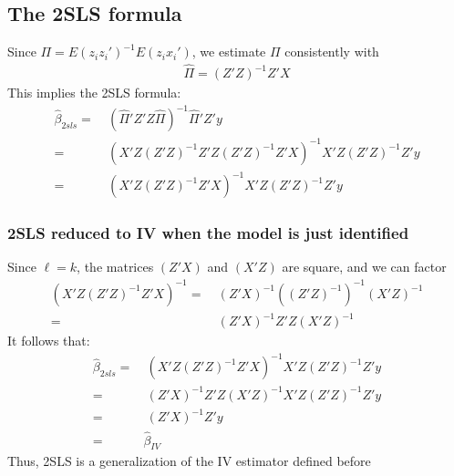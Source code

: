 \documentclass[a4paper,twoside,11pt]{article}
\begin{document}
\subsection{The 2SLS formula}
\begin{shaded*}
\noindent Since $\Pi = E(z_i z_i')^{-1} E(z_i x_i')$, we estimate $\Pi$ consistently with
\begin{equation*}
\begin{aligned}
\hat{\Pi} = (Z'Z)^{-1} Z'X
\end{aligned} 
\end{equation*}
This implies the 2SLS formula:
\begin{equation*}
\begin{aligned}
\hat{\beta}_{2sls} =& \  (\hat{\Pi}' Z'Z\hat{\Pi})^{-1} \hat{\Pi}' Z' y \\
=& \ (X'Z(Z'Z)^{-1} Z'Z(Z'Z)^{-1} Z'X)^{-1} X'Z(Z'Z)^{-1} Z'y \\
=& \ (X'Z(Z'Z)^{-1} Z'X)^{-1} X'Z(Z'Z)^{-1} Z'y
\end{aligned} 
\end{equation*}
\end{shaded*}
\subsubsection{2SLS reduced to IV when the model is just identified}
Since $\ell =k$, the matrices $(Z'X)$ and $(X'Z)$ are square, and we can factor
\begin{equation*}
\begin{aligned}
(X'Z(Z'Z)^{-1} Z'X)^{-1} =& \ (Z'X)^{-1} ((Z'Z)^{-1})^{-1} (X'Z)^{-1} \\
=& \ (Z'X)^{-1} Z'Z(X'Z)^{-1}
\end{aligned} 
\end{equation*}
It follows that:
\begin{equation*}
\begin{aligned}
\hat{\beta}_{2sls} =& \  (X'Z(Z'Z)^{-1} Z'X)^{-1} X'Z(Z'Z)^{-1} Z'y \\
=& \ (Z'X)^{-1} Z'Z (X'Z)^{-1} X'Z(Z'Z)^{-1} Z'y \\
=& \ (Z'X)^{-1} Z'y \\
=& \hat{\beta}_{IV}
\end{aligned} 
\end{equation*}
Thus, 2SLS is a generalization of the IV estimator defined before
\end{document}
